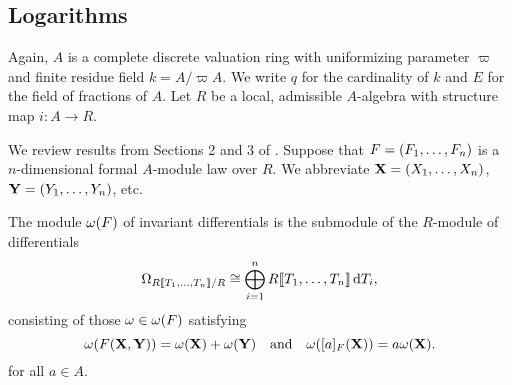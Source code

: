 \documentclass[../main.tex]{subfiles}
\begin{document}

\subsection{Logarithms} %
\label{sub:Logarithms}
Again, $A$ is a complete discrete valuation ring with uniformizing parameter 
$\varpi$ and finite residue field $k = A/\varpi A$. We write $q$ for the cardinality of 
$k$ and $E$ for the field of fractions of $A$. Let $R$ be a local,
admissible $A$-algebra with structure map $i\colon  A \to R$.

We review results from Sections
2 and 3 of \cite{hopkins1994equivariant}. 
Suppose that ${F} = (F_1, \dots, F_n)$ is a $n$-dimensional formal $A$-module
law over $R$. We abbreviate $\mathbf{X} = (X_1, \dots, X_n)$, $\mathbf{Y} = (Y_1,
\dots, Y_n)$, etc.

\begin{defi}
  The module $\omega({F})$ of invariant differentials is the submodule of the
  $R$-module of differentials
  \begin{equation*}
    \Omega_{R\llbracket T_1, \dots, T_n \rrbracket/R} \cong \bigoplus_{i=1}^n R\llbracket T_1, \dots, T_n
    \rrbracket \, \mathrm{d} T_i,
  \end{equation*}
  consisting of those $\omega \in \omega({F})$ satisfying
  \begin{equation}\label{eq:diffcond}
    \omega({F}(\mathbf{X},\mathbf{Y})) = \omega(\mathbf{X}) + \omega(\mathbf{Y})\quad \text{and} \quad
    \omega([a]_{F}(\mathbf{X})) = a\omega(\mathbf{X}).
  \end{equation} 
  for all $a \in A$. 
\end{defi}
\end{document}
